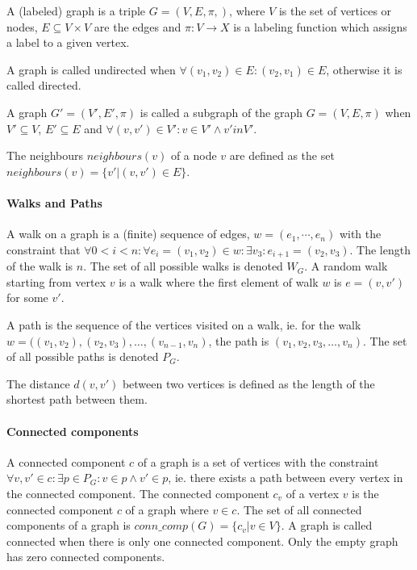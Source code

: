 


A (labeled) graph is a triple $G = (V, E, \pi, )$, where $V$ is the set of vertices or nodes, $E \subseteq V \times V$ are the edges and $\pi: V \to X$ is a labeling function which assigns a label to a given vertex.

A graph is called undirected when $\forall (v_1, v_2) \in E: (v_2, v_1) \in E$, otherwise it is called directed.

A graph $G'=(V', E', \pi)$ is called a subgraph of the graph $G = (V, E, \pi)$ when $V' \subseteq V$, $E' \subseteq E$ and $\forall (v, v') \in V': v \in V' \land v' in V'$.

The neighbours $neighbours(v)$ of a node $v$ are defined as the set $neighbours(v) = \{v' | (v, v') \in E \}$.

\paragraph{Walks and Paths}
A walk on a graph is a (finite) sequence of edges, $w = (e_1, \cdots, e_n)$ with the constraint that $\forall 0 < i < n: \forall e_i = (v_1, v_2) \in w: \exists v_3: e_{i + 1} = (v_2, v_3)$. The length of the walk is $n$.
The set of all possible walks is denoted $W_G$.
A random walk starting from vertex $v$ is a walk where the first element of walk $w$ is $e = (v, v')$ for some $v'$.

A path is the sequence of the vertices visited on a walk, ie. for the walk $w = ((v_1, v_2), (v_2, v_3), \dots, (v_{n-1}, v_n)$, the path is $(v_1, v_2, v_3, \dots, v_n)$.
The set of all possible paths is denoted $P_G$.

The distance $d(v, v')$ between two vertices is defined as the length of the shortest path between them.

\paragraph{Connected components}
A connected component $c$ of a graph is a set of vertices with the constraint $\forall v, v' \in c: \exists p \in P_G: v \in p \land v' \in p$, ie. there exists a path between every vertex in the connected component.
The connected component $c_v$ of a vertex $v$ is the connected component $c$ of a graph where $v \in c$.
The set of all connected components of a graph is $conn\_comp(G) = \{ c_v | v \in V \}$. A graph is called connected when there is only one connected component. Only the empty graph has zero connected components.

